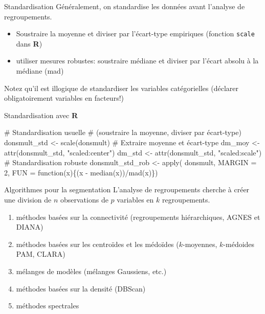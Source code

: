 \documentclass[
  ignorenonframetext,
]{beamer}
\newenvironment{Shaded}{\begin{snugshade}}{\end{snugshade}}
\newcommand{\AttributeTok}[1]{\textcolor[rgb]{0.40,0.45,0.13}{#1}}
\newcommand{\CommentTok}[1]{\textcolor[rgb]{0.37,0.37,0.37}{#1}}
\newcommand{\ControlFlowTok}[1]{\textcolor[rgb]{0.00,0.23,0.31}{#1}}
\newcommand{\DecValTok}[1]{\textcolor[rgb]{0.68,0.00,0.00}{#1}}
\newcommand{\FunctionTok}[1]{\textcolor[rgb]{0.28,0.35,0.67}{#1}}
\newcommand{\NormalTok}[1]{\textcolor[rgb]{0.00,0.23,0.31}{#1}}
\newcommand{\OtherTok}[1]{\textcolor[rgb]{0.00,0.23,0.31}{#1}}
\newcommand{\SpecialCharTok}[1]{\textcolor[rgb]{0.37,0.37,0.37}{#1}}
\newcommand{\StringTok}[1]{\textcolor[rgb]{0.13,0.47,0.30}{#1}}
\providecommand{\tightlist}{%
  \setlength{\itemsep}{0pt}\setlength{\parskip}{0pt}}\usepackage{longtable,booktabs,array}
\begin{document}
\begin{frame}[fragile]{Standardisation}
\protect\hypertarget{standardisation}{}
Généralement, on standardise les données avant l'analyse de
regroupements.

\begin{itemize}
\tightlist
\item
  Soustraire la moyenne et diviser par l'écart-type empiriques (fonction
  \texttt{scale} dans \textbf{R})
\item
  utiliser mesures robustes: soustraire médiane et diviser par l'écart
  absolu à la médiane (mad)
\end{itemize}

Notez qu'il est illogique de standardiser les variables catégorielles
(déclarer obligatoirement variables en facteurs!)
\end{frame}

\begin{frame}[fragile]{Standardisation avec \textbf{R}}
\protect\hypertarget{standardisation-avec-r}{}
\begin{Shaded}
\begin{Highlighting}[numbers=left,,]
\CommentTok{\# Standardisation usuelle}
\CommentTok{\# (soustraire la moyenne, diviser par écart{-}type)}
\NormalTok{donsmult\_std }\OtherTok{\textless{}{-}} \FunctionTok{scale}\NormalTok{(donsmult)}
\CommentTok{\# Extraire moyenne et écart{-}type}
\NormalTok{dm\_moy }\OtherTok{\textless{}{-}} \FunctionTok{attr}\NormalTok{(donsmult\_std, }\StringTok{"scaled:center"}\NormalTok{)}
\NormalTok{dm\_std }\OtherTok{\textless{}{-}} \FunctionTok{attr}\NormalTok{(donsmult\_std, }\StringTok{"scaled:scale"}\NormalTok{)}
\CommentTok{\# Standardisation robuste}
\NormalTok{donsmult\_std\_rob }\OtherTok{\textless{}{-}} \FunctionTok{apply}\NormalTok{(}
\NormalTok{  donsmult,}
  \AttributeTok{MARGIN =} \DecValTok{2}\NormalTok{,}
  \AttributeTok{FUN =} \ControlFlowTok{function}\NormalTok{(x)\{(x }\SpecialCharTok{{-}} \FunctionTok{median}\NormalTok{(x))}\SpecialCharTok{/}\FunctionTok{mad}\NormalTok{(x)\})}
\end{Highlighting}
\end{Shaded}
\end{frame}

\begin{frame}{Algorithmes pour la segmentation}
\protect\hypertarget{algorithmes-pour-la-segmentation}{}
L'analyse de regroupements cherche à créer une division de \(n\)
observations de \(p\) variables en \(k\) regroupements.

\begin{enumerate}
\tightlist
\item
  méthodes basées sur la connectivité (regroupements hiérarchiques,
  AGNES et DIANA)
\item
  méthodes basées sur les centroïdes et les médoïdes (\(k\)-moyennes,
  \(k\)-médoides PAM, CLARA)
\item
  mélanges de modèles (mélanges Gaussiens, etc.)
\item
  méthodes basées sur la densité (DBScan)
\item
  méthodes spectrales
\end{enumerate}
\end{frame}
\end{document}
